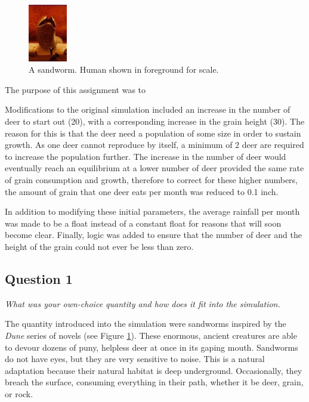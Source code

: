 \documentclass{article}
\begin{document}
\begin{figure}
        \begin{center}
        \includegraphics[width=0.15\textwidth]{Sandworm_heretics.jpg}
        \end{center}
        \caption{A sandworm.  Human shown in foreground for scale.}
        \label{fig:Sandworm}
\end{figure}
The purpose of this assignment was to 

Modifications to the original simulation included an increase in the number of deer to start out (20), with a corresponding increase in the grain height (30).  The reason for this is that the deer need a population of some size in order to sustain growth.  As one deer cannot reproduce by itself, a minimum of 2 deer are required to increase the population further.  The increase in the number of deer would eventually reach an equilibrium at a lower number of deer provided the same rate of grain consumption and growth, therefore to correct for these higher numbers, the amount of grain that one deer eats per month was reduced to 0.1 inch.

In addition to modifying these initial parameters, the average rainfall per month was made to be a float instead of a constant float for reasons that will soon become clear.  Finally, logic was added to ensure that the number of deer and the height of the grain could not ever be less than zero.

\subsection*{Question 1}
\textit{What was your own-choice quantity and how does it fit into the simulation.}

The quantity introduced into the simulation were sandworms inspired by the \textit{Dune} series of novels (see Figure \ref{fig:Sandworm}).  These enormous, ancient creatures are able to devour dozens of puny, helpless deer at once in its gaping mouth.  Sandworms do not have eyes, but they are very sensitive to noise.  This is a natural adaptation because their natural habitat is deep underground.  Occasionally, they breach the surface, consuming everything in their path, whether it be deer, grain, or rock.
\end{document}

